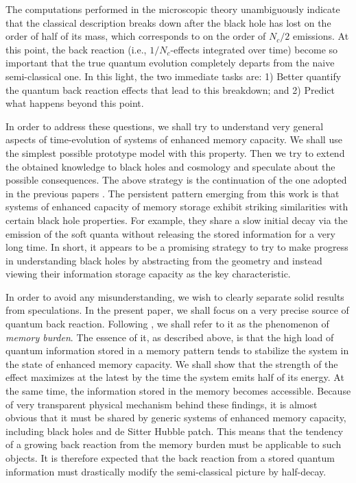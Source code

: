 \documentclass[aps,prd,reprint,superscriptaddress,nofootinbib]{revtex4-2}
\begin{document}
 The computations performed in the microscopic theory 
  \cite{Dvali:2013eja,Dvali:2012rt,Dvali:2012wq,Dvali:2013vxa,Dvali:2017eba} unambiguously indicate that the classical description breaks down after the black hole has lost on the order of half of its mass, which corresponds to on the order of $N_c/2$ emissions. At this point, the back reaction 
 (i.e., $1/N_c$-effects integrated over time) become
 so important that the true quantum evolution completely 
departs from the naive semi-classical one. 
In this light, the two immediate tasks are: 1) Better quantify the quantum back reaction effects that lead to this breakdown; 
and 2) Predict 
what happens beyond this point.
 
In order to address these questions, 
  we shall try to understand very general 
 aspects of time-evolution of systems of enhanced memory capacity. 
 We shall use the simplest possible prototype model
 with this property. 
  Then we try to 
 extend the obtained knowledge to black holes and  cosmology and speculate 
 about the possible consequences.
The above strategy is the continuation of the one adopted in the previous 
papers   \cite{1207.4059, 1507.02948,1507.08952, 1601.01329, 1711.09079,1801.03918, 1712.02233, 1805.10292, 1810.02336, 1812.08749, 1906.03530, 1907.07332, 2003.05546}. 
The persistent pattern emerging from this work 
 is that systems of enhanced capacity of memory storage exhibit  
 striking similarities with certain black hole 
properties.  For example, they share a slow initial decay via the emission 
of the soft quanta without releasing the stored information for a very long time. In short, it appears to be a promising 
 strategy to try to make progress in understanding 
black holes by abstracting from the geometry and instead viewing their information storage capacity as the key characteristic. 


In order to avoid any misunderstanding, we wish to clearly separate 
  solid results from speculations. 
  In the present paper,  we shall focus on a very precise source of quantum back reaction. Following  \cite{1810.02336, 1812.08749}, we shall refer to it as the phenomenon of {\it memory burden}.  The essence of 
  it, as described above, is that the high load of quantum information 
  stored in a memory pattern tends to stabilize the system in the 
  state of enhanced memory capacity.  We shall show that the 
  strength of the effect maximizes at the latest by the time the system 
  emits half of its energy.  At the same time, the information stored in the memory becomes accessible. Because of very transparent physical mechanism behind these findings, 
  it is almost obvious that it must be shared by generic systems 
  of enhanced memory capacity, including black holes   
  and  de Sitter Hubble patch.  This means that the tendency of a growing 
 back reaction from the memory burden must be applicable to such 
 objects. It is therefore expected that the back reaction  
 from a stored quantum information must drastically modify 
 the semi-classical picture by half-decay. 
 
\end{document}
